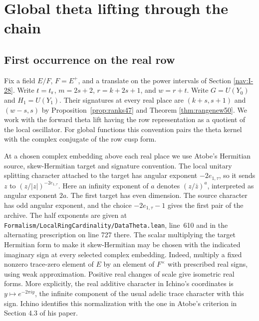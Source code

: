 \documentclass[a4paper,11pt]{article}
\theoremstyle{definition}
\theoremstyle{remark}
\newcommand{\srcloc}[2]{{\small\nolinkurl{#1.lean}}, line~#2}
\numberwithin{equation}{section}
\begin{document}
\section{Global theta lifting through the chain}\label{nav:g-VI-2}

\subsection{First occurrence on the real row}\label{nav:VIII-00}
\label{sec:first167}

Fix a field \(E/F\), \(F=E^+\), and a translate on the power
intervals of Section \ref{nav:I-28}. Write \(t=t_{\rm r}\),
\(m=2s+2\), \(r=k+2s+1\), and \(w=r+t\).
Write \(G=U(Y_0)\) and \(H_1=U(Y_1)\). Their signatures at
every real place are \((k+s,s+1)\) and \((w-s,s)\) by
Proposition~\ref{prop:ranks47} and Theorem \ref{thm:rangenew50}.
We work with the forward theta lift having
the row representation as a quotient of the local oscillator.
For global functions this convention pairs the theta kernel
with the complex conjugate of the row cusp form.

At a chosen complex embedding above each real place we use
Atobe's Hermitian source, skew-Hermitian target and signature
convention. The local unitary splitting character attached to
the target has angular exponent \(-2e_{1,\tau}\), so it sends
\(z\) to \((z/|z|)^{-2e_{1,\tau}}\). Here an infinity exponent
of \(a\) denotes \((z/\bar z)^a\), interpreted as angular
exponent \(2a\). The first target has even dimension. The
source character has odd angular exponent, and the choice
\(-2e_{1,\tau}-1\) gives the first pair of the archive.
The half exponents are given at
\srcloc{Formalism/LocalRingCardinality/DataTheta}{610}
and in the alternating prescription on line 727 there.
The scalar multiplying the target Hermitian form to make it
skew-Hermitian may be chosen with the indicated imaginary sign
at every selected complex embedding. Indeed, multiply a fixed
nonzero trace-zero element of \(E\) by an element of \(F^\times\)
with prescribed real signs, using weak approximation. Positive
real changes of scale give isometric real forms. More
explicitly, the real additive character in Ichino's
coordinates is \(y\mapsto e^{-2\pi i y}\), the infinite
component of the usual adelic trace character with this
sign. Ichino identifies this normalization with the one in
Atobe's criterion in Section 4.3 of his paper.
\end{document}
